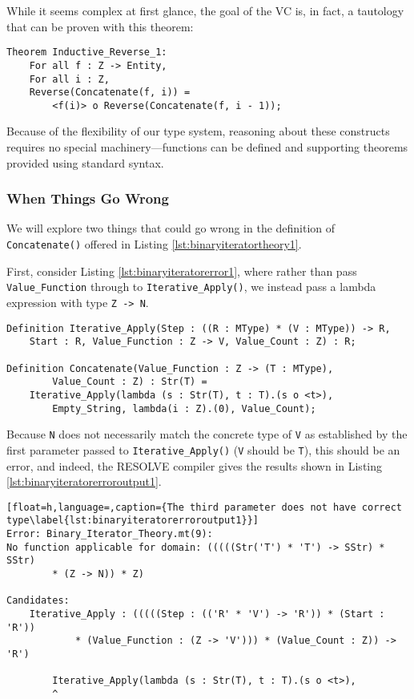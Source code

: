 While it seems complex at first glance, the goal of the VC is, in fact, a tautology that can be proven with this theorem:

\begin{lstlisting}
Theorem Inductive_Reverse_1:
	For all f : Z -> Entity,
	For all i : Z,
	Reverse(Concatenate(f, i)) = 
		<f(i)> o Reverse(Concatenate(f, i - 1));
\end{lstlisting}

Because of the flexibility of our type system, reasoning about these constructs requires no special machinery---functions can be defined and supporting theorems provided using standard syntax.

		\subsubsection{When Things Go Wrong}	%

We will explore two things that could go wrong in the definition of \texttt{Concatenate()} offered in Listing \ref{lst:binaryiteratortheory1}.

First, consider Listing \ref{lst:binaryiteratorerror1}, where rather than pass \texttt{Value\_Function} through to \texttt{Iterative\_Apply()}, we instead pass a lambda expression with type \texttt{Z -> N}.

\begin{lstlisting}[float=h,language=resolve,caption={Passing an incorrectly-typed \texttt{Value\_Function}\label{lst:binaryiteratorerror1}}]
Definition Iterative_Apply(Step : ((R : MType) * (V : MType)) -> R,
	Start : R, Value_Function : Z -> V, Value_Count : Z) : R;

Definition Concatenate(Value_Function : Z -> (T : MType), 
		Value_Count : Z) : Str(T) = 
	Iterative_Apply(lambda (s : Str(T), t : T).(s o <t>),
		Empty_String, lambda(i : Z).(0), Value_Count);
\end{lstlisting}

Because \texttt{N} does not necessarily match the concrete type of \texttt{V} as established by the first parameter passed to \texttt{Iterative\_Apply()} (\texttt{V} should be \texttt{T}), this should be an error, and indeed, the RESOLVE compiler gives the results shown in Listing \ref{lst:binaryiteratorerroroutput1}.

\begin{lstlisting}[float=h,language=,caption={The third parameter does not have correct type\label{lst:binaryiteratorerroroutput1}}]
Error: Binary_Iterator_Theory.mt(9):
No function applicable for domain: (((((Str('T') * 'T') -> SStr) * SStr) 
		* (Z -> N)) * Z)

Candidates:
	Iterative_Apply : (((((Step : (('R' * 'V') -> 'R')) * (Start : 'R'))
			* (Value_Function : (Z -> 'V'))) * (Value_Count : Z)) -> 'R')

		Iterative_Apply(lambda (s : Str(T), t : T).(s o <t>),
		^
\end{lstlisting}

